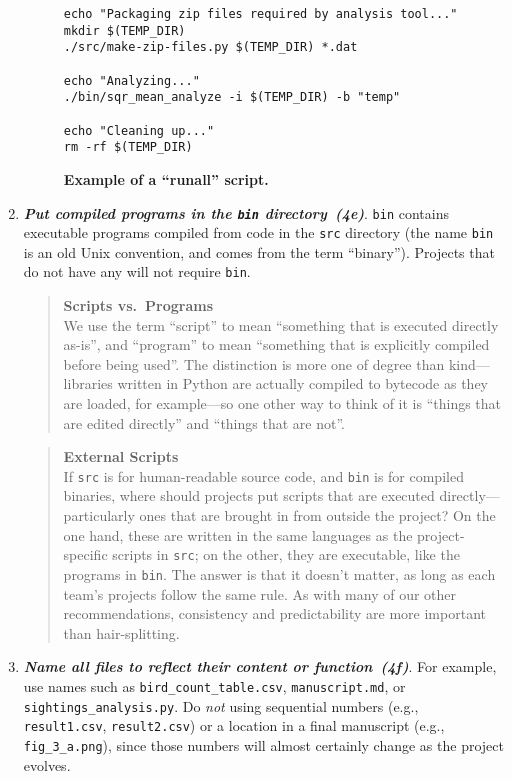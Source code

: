 \documentclass[10pt,letterpaper]{article}
\newcommand{\practice}[2]{\textbf{\emph{{#2}~({#1})}}}
\begin{document}
\begin{enumerate}
\begin{figure}
{\begin{verbatim}
echo "Packaging zip files required by analysis tool..."
mkdir $(TEMP_DIR)
./src/make-zip-files.py $(TEMP_DIR) *.dat

echo "Analyzing..."
./bin/sqr_mean_analyze -i $(TEMP_DIR) -b "temp"

echo "Cleaning up..."
rm -rf $(TEMP_DIR)
\end{verbatim}
}
\caption{\textbf{Example of a ``runall'' script.}}
\label{fig:script}
\end{figure}

\item

\pagebreak

  \practice{4e}{Put compiled programs in the \texttt{bin} directory}.
  \texttt{bin} contains executable programs compiled from code in the
  \texttt{src} directory (the name \texttt{bin} is an old Unix
  convention, and comes from the term ``binary''). Projects that
  do not have any will not require \texttt{bin}.

  \begin{quote}
    \noindent \textbf{Scripts vs.\ Programs}
    \\
    We use the term ``script'' to mean ``something that is executed
    directly as-is'', and ``program'' to mean ``something that is
    explicitly compiled before being used''.  The distinction is more
    one of degree than kind---libraries written in Python are actually
    compiled to bytecode as they are loaded, for example---so one
    other way to think of it is ``things that are edited directly''
    and ``things that are not''.
  \end{quote}

  \begin{quote}
    \noindent \textbf{External Scripts}
    \\
    If \texttt{src} is for human-readable source code, and
    \texttt{bin} is for compiled binaries, where should projects put
    scripts that are executed directly---particularly ones that are
    brought in from outside the project?  On the one hand, these are
    written in the same languages as the project-specific scripts in
    \texttt{src}; on the other, they are executable, like the programs
    in \texttt{bin}.  The answer is that it doesn't matter, as long as
    each team's projects follow the same rule.  As with many of our
    other recommendations, consistency and predictability are more
    important than hair-splitting.
  \end{quote}

\item

  \practice{4f}{Name all files to reflect their content or function}.
  For example, use names such as \texttt{bird\_count\_table.csv},
  \texttt{manuscript.md}, or \texttt{sightings\_analysis.py}.  Do
  \emph{not} using sequential numbers (e.g., \texttt{result1.csv},
  \texttt{result2.csv}) or a location in a final manuscript (e.g.,
  \texttt{fig\_3\_a.png}), since those numbers will almost certainly
  change as the project evolves.

\end{enumerate}
\end{document}
